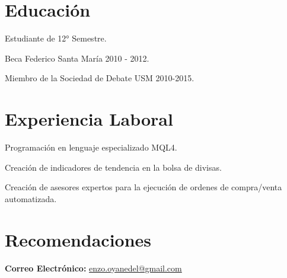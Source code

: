 \documentclass[letterpaper]{deedy-resume}
\begin{document}
\begin{minipage}[t]{0.66\textwidth} 

\section{Educación}

\vspace{\topsep} %
\begin{tightitemize}
\item Estudiante de 12° Semestre.
\item Beca Federico Santa María 2010 - 2012.
\item Miembro de la Sociedad de Debate USM 2010-2015.
\end{tightitemize}

\sectionspace

\section{Experiencia Laboral}

 \parskip -10pt 
\begin{tightitemize}
\item Programación en lenguaje especializado MQL4.
\item Creación de indicadores de tendencia en la bolsa de divisas.
\item 
    Creación de asesores expertos para la ejecución de ordenes de
    compra/venta automatizada.
\end{tightitemize}

\parskip 0pt 
\sectionspace

\section{Recomendaciones}

{\bf Correo Electrónico:} 
\href{mailto:enzo.oyanedel@gmail.com}{enzo.oyanedel@gmail.com}
\sectionspace


\end{minipage}
\end{document}
